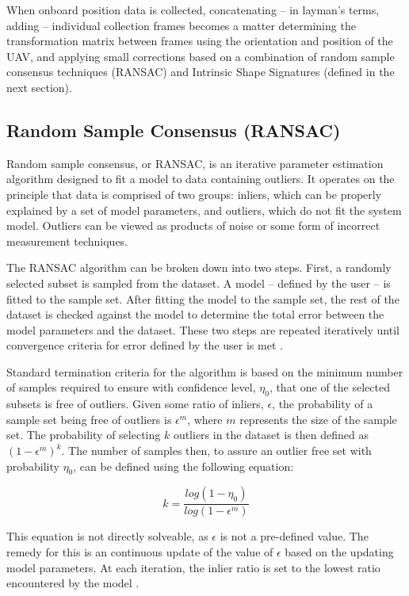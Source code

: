 \documentclass[12pt]{drexelthesis}
\let\Oldsubsection\subsection
\renewcommand{\subsection}{\FloatBarrier\Oldsubsection}
\begin{document}
When onboard position data is collected, concatenating -- in layman's terms, adding -- individual collection frames becomes a matter determining the transformation matrix between frames using the orientation and position of the UAV, and applying small corrections based on a combination of random sample consensus techniques (RANSAC) and Intrinsic Shape Signatures (defined in the next section).

\subsection{Random Sample Consensus (RANSAC)}
\label{subsec:ransac}
Random sample consensus, or RANSAC, is an iterative parameter estimation algorithm designed to fit a model to data containing outliers. It operates on the principle that data is comprised of two groups: inliers, which can be properly explained by a set of model parameters, and outliers, which do not fit the system model. Outliers can be viewed as products of noise or some form of incorrect measurement techniques.

The RANSAC algorithm can be broken down into two steps. First, a randomly selected subset is sampled from the dataset. A model -- defined by the user -- is fitted to the sample set. After fitting the model to the sample set, the rest of the dataset is checked against the model to determine the total error between the model parameters and the dataset. These two steps are repeated iteratively until convergence criteria for error defined by the user is met \cite{ransac1}.

Standard termination criteria for the algorithm is based on the minimum number of samples required to ensure with confidence level, $\eta_{0}$, that one of the selected subsets is free of outliers. Given some ratio of inliers, $\epsilon$, the probability of a sample set being free of outliers is $\epsilon^{m}$, where $m$ represents the size of the sample set. The probability of selecting $k$ outliers in the dataset is then defined as $(1 - \epsilon^{m})^{k}$. The number of samples then, to assure an outlier free set with probability $\eta_{0}$, can be defined using the following equation:

\begin{equation}
	k = \frac {log(1-\eta_{0})} { log(1-\epsilon^{m})}
\end{equation}

This equation is not directly solveable, as $\epsilon$ is not a pre-defined value. The remedy for this is an continuous update of the value of $\epsilon$ based on the updating model parameters. At each iteration, the inlier ratio is set to the lowest ratio encountered by the model \cite{ransac2}.
\end{document}
